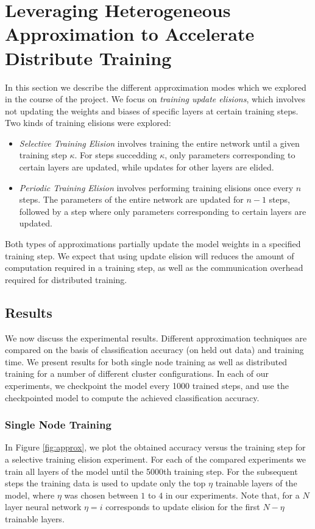 \section{Leveraging Heterogeneous Approximation to Accelerate Distribute Training}
In this section we describe the different approximation modes which we explored in the course of the project. We focus on \textit{training update elisions}, which involves not updating the weights and biases of specific layers at certain training steps. Two kinds of training elisions were explored:
\begin{itemize}
	\item \textit{Selective Training Elision} involves training the entire network until a given training step $\kappa$. For steps succedding $\kappa$, only parameters corresponding to certain layers are updated, while updates for other layers are elided.
	\item \textit{Periodic Training Elision} involves performing training elisions once every $n$ steps. The parameters of the entire network are updated for $n-1$ steps, followed by a step where only parameters corresponding to certain layers are updated.
\end{itemize}

Both types of approximations partially update the model weights in a specified training step. We expect that using update elision will  reduces the amount of computation required in a training step, as well as the communication overhead required for distributed training. 

\subsection{Results}
We now discuss the experimental results. Different approximation techniques are compared on the basis of classification accuracy (on held out data) and training time. We present results for both single node training as well as distributed training for a number of different cluster configurations. In each of our experiments, we checkpoint the model every 1000 trained steps, and use the checkpointed model to compute the achieved classification accuracy.

\subsubsection{Single Node Training}

In Figure \ref{fig:approx}, we plot the obtained accuracy versus the training step for a selective training elision experiment. For each of the compared experiments we train all layers of the model until the 5000th training step. For the subsequent steps the training data is used to update only the top $\eta$ trainable layers of the model, where $\eta$ was chosen between $1$ to $4$ in our experiments. Note that, for a $N$ layer neural network $\eta=i$ corresponds to update elision for the first $N-\eta$ trainable layers.

